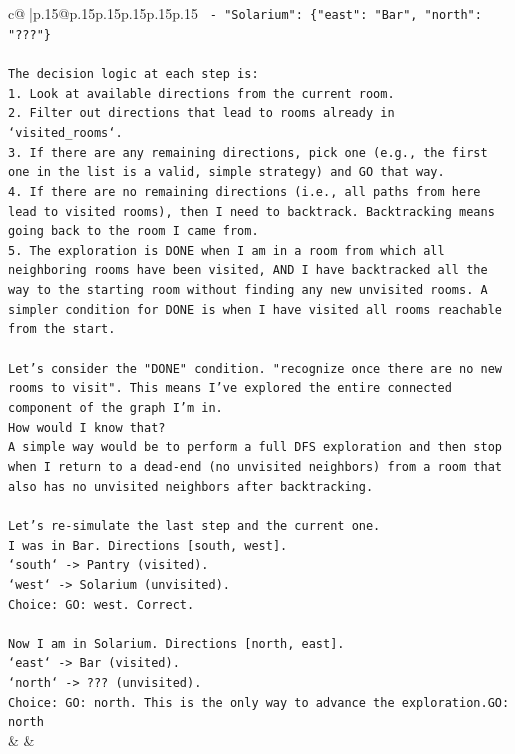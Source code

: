 \documentclass{article}
\begin{document}
{\begin{supertabular}{c@{$\;$}|p{.15\linewidth}@{}p{.15\linewidth}p{.15\linewidth}p{.15\linewidth}p{.15\linewidth}p{.15\linewidth}}
{{{\texttt{    {-} "Solarium": \{"east": "Bar", "north": "???"\}} \\
\\ 
\texttt{The decision logic at each step is:} \\
\texttt{1. Look at available directions from the current room.} \\
\texttt{2. Filter out directions that lead to rooms already in `visited\_rooms`.} \\
\texttt{3. If there are any remaining directions, pick one (e.g., the first one in the list is a valid, simple strategy) and GO that way.} \\
\texttt{4. If there are no remaining directions (i.e., all paths from here lead to visited rooms), then I need to backtrack. Backtracking means going back to the room I came from.} \\
\texttt{5. The exploration is DONE when I am in a room from which all neighboring rooms have been visited, AND I have backtracked all the way to the starting room without finding any new unvisited rooms. A simpler condition for DONE is when I have visited all rooms reachable from the start.} \\
\\ 
\texttt{Let's consider the "DONE" condition. "recognize once there are no new rooms to visit". This means I've explored the entire connected component of the graph I'm in.} \\
\texttt{How would I know that?} \\
\texttt{A simple way would be to perform a full DFS exploration and then stop when I return to a dead{-}end (no unvisited neighbors) from a room that also has no unvisited neighbors after backtracking.} \\
\\ 
\texttt{Let's re{-}simulate the last step and the current one.} \\
\texttt{I was in Bar. Directions {[}south, west{]}.} \\
\texttt{`south` {-}> Pantry (visited).} \\
\texttt{`west` {-}> Solarium (unvisited).} \\
\texttt{Choice: GO: west. Correct.} \\
\\ 
\texttt{Now I am in Solarium. Directions {[}north, east{]}.} \\
\texttt{`east` {-}> Bar (visited).} \\
\texttt{`north` {-}> ??? (unvisited).} \\
\texttt{Choice: GO: north. This is the only way to advance the exploration.GO: north} \\
            }
        }
    }
    & & \\ \\


\end{supertabular}}
\end{document}
